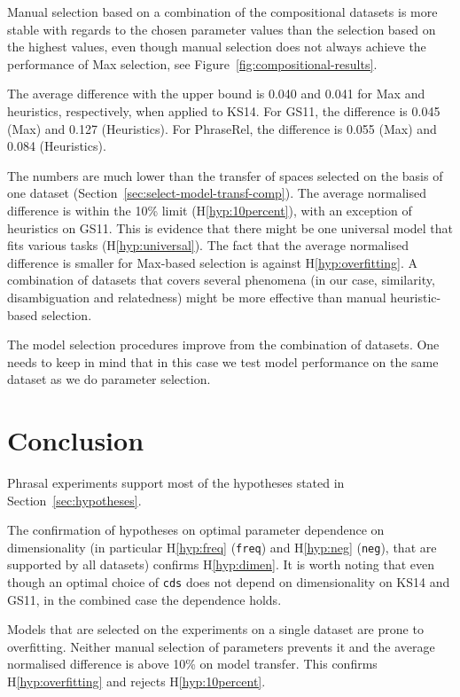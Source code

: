Manual selection based on a combination of the compositional datasets is more stable with regards to the chosen parameter values than the selection based on the highest values, even though manual selection does not always achieve the performance of Max selection, see Figure~\ref{fig:compositional-results}.

The average difference with the upper bound is 0.040 and 0.041 for Max and heuristics, respectively, when applied to KS14. For GS11, the difference is 0.045 (Max) and 0.127 (Heuristics). For PhraseRel, the difference is 0.055 (Max) and 0.084 (Heuristics).

The numbers are much lower than the transfer of spaces selected on the basis of one dataset (Section~\ref{sec:select-model-transf-comp}). The average normalised difference is within the 10\% limit (H\ref{hyp:10percent}), with an exception of heuristics on GS11. This is evidence that there might be one universal model that fits various tasks (H\ref{hyp:universal}). The fact that the average normalised difference is smaller for Max-based selection is against H\ref{hyp:overfitting}. A combination of datasets that covers several phenomena (in our case, similarity, disambiguation and relatedness) might be more effective than manual heuristic-based selection.

The model selection procedures improve from the combination of datasets. One needs to keep in mind that in this case we test model performance on the same dataset as we do parameter selection.

\section{Conclusion}
\label{sec:conclusion-comp}

Phrasal experiments support most of the hypotheses stated in
Section~\ref{sec:hypotheses}.

The confirmation of hypotheses on optimal parameter dependence on dimensionality (in particular H\ref{hyp:freq} (\texttt{freq}) and H\ref{hyp:neg} (\texttt{neg}), that are supported by all datasets) confirms H\ref{hyp:dimen}. It is worth noting that even though an optimal choice of \texttt{cds} does not depend on dimensionality on KS14 and GS11, in the combined case the dependence holds.

Models that are selected on the experiments on a single dataset are prone to overfitting. Neither manual selection of parameters prevents it and the average normalised difference is above 10\% on model transfer. This confirms H\ref{hyp:overfitting} and rejects H\ref{hyp:10percent}.

